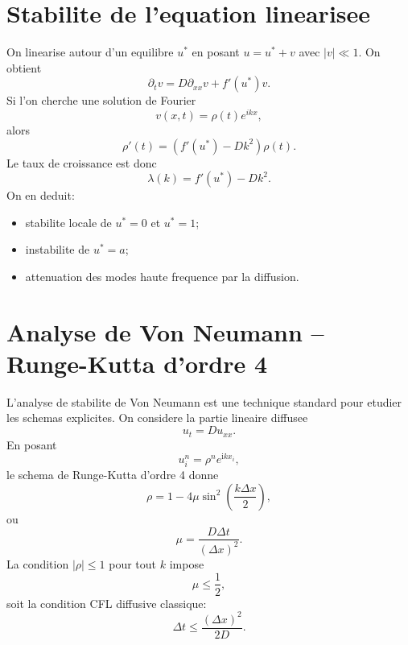 \documentclass[11pt,a4paper]{report}
\begin{document}
\section{Stabilite de l'equation linearisee}
On linearise autour d'un equilibre $u^*$ en posant $u=u^*+v$ avec $|v|\ll 1$.
On obtient
\begin{equation}
\partial_t v = D\partial_{xx}v + f'(u^*)v.
\end{equation}
Si l'on cherche une solution de Fourier
\begin{equation}
 v(x,t)=\rho(t)e^{ikx},
\end{equation}
alors
\begin{equation}
 \rho'(t)=\left(f'(u^*)-Dk^2\right)\rho(t).
\end{equation}
Le taux de croissance est donc
\begin{equation}
 \lambda(k)=f'(u^*)-Dk^2.
\end{equation}
On en deduit:
\begin{itemize}[leftmargin=1.5em]
  \item stabilite locale de $u^*=0$ et $u^*=1$;
  \item instabilite de $u^*=a$;
  \item attenuation des modes haute frequence par la diffusion.
\end{itemize}

\section{Analyse de Von Neumann -- Runge-Kutta d'ordre 4}
L'analyse de stabilite de Von Neumann \cite{Trefethen1996,LeVeque2007} est une technique
standard pour etudier les schemas explicites.
On considere la partie lineaire diffusee
\begin{equation}
 u_t = D u_{xx}.
\end{equation}
En posant
\begin{equation}
 u_i^n = \rho^n e^{\mathrm{i}k x_i},
\end{equation}
le schema de Runge-Kutta d'ordre 4 donne
\begin{equation}
 \rho = 1 - 4\mu\sin^2\left(\frac{k\Delta x}{2}\right),
\end{equation}
ou
\begin{equation}
 \mu = \frac{D\Delta t}{(\Delta x)^2}.
\end{equation}
La condition $|\rho|\le 1$ pour tout $k$ impose
\begin{equation}
 \mu \le \frac{1}{2},
\end{equation}
soit la condition CFL diffusive classique:
\begin{equation}
 \Delta t \le \frac{(\Delta x)^2}{2D}.
\end{equation}
\end{document}
